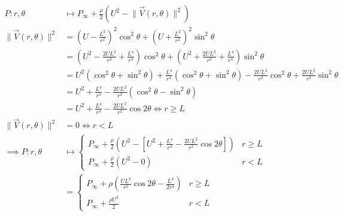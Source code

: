 \begin{align*}
    P:r,\theta&\mapsto P_\infty+\frac{\rho}{2}\left(U^2-\lVert\vec{V}(r,\theta)\rVert^2\right)\\
    \lVert\vec{V}(r,\theta)\rVert^2&=\left(U-\frac{L^2}{r^{2}}\right)^2\cos^2\theta+\left(U+\frac{L^2}{r^{2}}\right)^2\sin^2\theta\\
    &=\left(U^2-\frac{2UL^2}{r^2}+\frac{L^4}{r^4}\right)\cos^2\theta+\left(U^2+\frac{2UL^2}{r^2}+\frac{L^4}{r^4}\right)\sin^2\theta\\
    &=U^2\left(\cos^2\theta+\sin^2\theta\right)+\frac{L^4}{r^4}\left(\cos^2\theta+\sin^2\theta\right)-\frac{2UL^2}{r^2}\cos^2\theta+\frac{2UL^2}{r^2}\sin^2\theta\\
    &=U^2+\frac{L^4}{r^4}-\frac{2UL^2}{r^2}\left(\cos^2\theta-\sin^2\theta\right)\\
    &=U^2+\frac{L^4}{r^4}-\frac{2UL^2}{r^2}\cos2\theta\iff r\geq L\\
    \lVert\vec{V}(r,\theta)\rVert^2&=0\iff r<L\\
    \implies P:r,\theta&\mapsto\left\{\begin{matrix}
        P_\infty+\frac{\rho}{2}\left(U^2-\left[U^2+\frac{L^4}{r^4}-\frac{2UL^2}{r^2}\cos2\theta\right]\right) & r\geq L\\
        P_\infty+\frac{\rho}{2}\left(U^2-0\right) & r<L
    \end{matrix}\right.\\
    &=\left\{\begin{matrix}
        P_\infty+\rho\left(\frac{UL^2}{r^2}\cos2\theta-\frac{L^4}{2r^4}\right) & r\geq L\\
        P_\infty+\frac{\rho U^2}{2} & r<L
    \end{matrix}\right.
\end{align*}